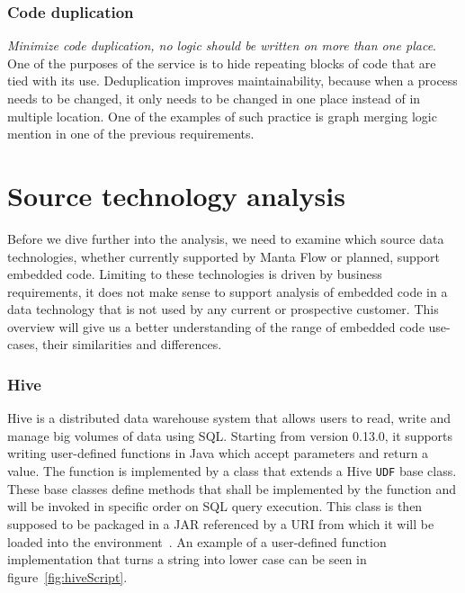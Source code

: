 \subsubsection{Code duplication}

\textit{Minimize code duplication, no logic should be written on more than one place}. One of the purposes of the service is to hide repeating blocks of code that are tied with its use. Deduplication improves maintainability, because when a process needs to be changed, it only needs to be changed in one place instead of in multiple location. One of the examples of such practice is graph merging logic mention in one of the previous requirements.

\section{Source technology analysis}

Before we dive further into the analysis, we need to examine which source data technologies, whether currently supported by Manta Flow or planned, support embedded code. Limiting to these technologies is driven by business requirements, it does not make sense to support analysis of embedded code in a data technology that is not used by any current or prospective customer. This overview will give us a better understanding of the range of embedded code use-cases, their similarities and differences.

\subsubsection{Hive}
Hive is a distributed data warehouse system that allows users to read, write and manage big volumes of data using SQL. Starting from version 0.13.0, it supports writing user-defined functions in Java which accept parameters and return a value. The function is implemented by a class that extends a Hive \texttt{UDF} base class. These base classes define methods that shall be implemented by the function and will be invoked in specific order on SQL query execution. This class is then supposed to be packaged in a JAR referenced by a URI from which it will be loaded into the environment~\cite{hive}. An example of a user-defined function implementation that turns a string into lower case can be seen in figure~\ref{fig:hiveScript}.

